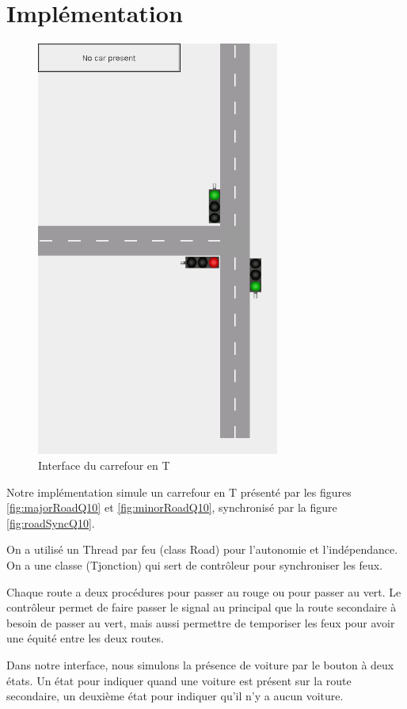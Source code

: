 \documentclass[pdftex,12pt,a4paper]{article}
\begin{document}
\section{Implémentation}

\begin{figure}[H]
  \centering
  \includegraphics[width=8cm, angle=90]{ressources/impl/Tjunction.png}
  \caption{\label{fig:screenshot} Interface du carrefour en T}
\end{figure}


Notre implémentation simule un carrefour en T présenté par les figures \ref{fig:majorRoadQ10} et \ref{fig:minorRoadQ10}, synchronisé par la figure \ref{fig:roadSyncQ10}.

On a utilisé un Thread par feu (class Road) pour l'autonomie et l'indépendance.
On a une classe (Tjonction) qui sert de contrôleur pour synchroniser les feux.

Chaque route a deux procédures pour passer au rouge ou pour passer au vert. Le contrôleur permet de faire passer le signal au principal que la route secondaire à besoin de passer au vert, mais aussi permettre de temporiser les feux pour avoir une équité entre les deux routes.

Dans notre interface, nous simulons la présence de voiture par le bouton à deux états.
Un état pour indiquer quand une voiture est présent sur la route secondaire, un deuxième état pour indiquer qu'il n'y a aucun voiture.
\end{document}
